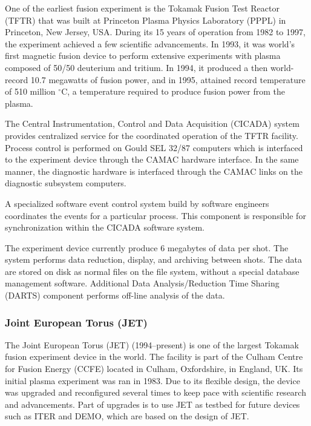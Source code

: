 One of the earliest fusion experiment is the Tokamak Fusion Test Reactor (TFTR) that was built at Princeton Plasma Physics Laboratory (PPPL) in Princeton, New Jersey, USA. During its 15 years of operation from 1982 to 1997, the experiment achieved a few scientific advancements. In 1993, it was world's first magnetic fusion device to perform extensive experiments with plasma composed of 50/50 deuterium and tritium\cite{PhysRevLett.72.3526}. In 1994, it produced a then world-record 10.7 megawatts of fusion power, and in 1995, attained record temperature of 510 million $^{\circ}$C, a temperature required to produce fusion power from the plasma\cite{534283}.

The Central Instrumentation, Control and Data Acquisition (CICADA) system provides centralized service for the coordinated operation of the TFTR facility\cite{:/content/aip/journal/rsi/56/5/10.1063/1.1138006}. Process control is performed on Gould SEL 32/87 computers which is interfaced to the experiment device through the CAMAC hardware interface. In the same manner, the diagnostic hardware is interfaced through the CAMAC links on the diagnostic subsystem computers.

A specialized software event control system build by software engineers coordinates the events for a particular process. This component is responsible for synchronization within the CICADA software system.

The experiment device currently produce 6 megabytes of data per shot. The system performs data reduction, display, and archiving between shots. The data are stored on disk as normal files on the file system, without a special database management software. Additional Data Analysis/Reduction Time Sharing (DARTS) component performs off-line analysis of the data.

\subsubsection{Joint European Torus (JET)}

The Joint European Torus (JET)\cite{gibson1977jet, website:jet_ccfe, 0029-5515-25-9-003} (1994--present) is one of the largest Tokamak fusion experiment device in the world. The facility is part of the Culham Centre for Fusion Energy (CCFE) located in Culham, Oxfordshire, in England, UK. Its initial plasma experiment was ran in 1983. Due to its flexible design, the device was upgraded and reconfigured several times to keep pace with scientific research and advancements. Part of upgrades is to use JET as testbed for future devices such as ITER\cite{dietz1996iter,di2011codac} and DEMO\cite{konishi2002demo}, which are based on the design of JET.

